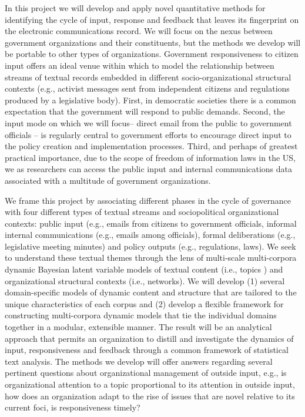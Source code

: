 In this project we will develop and apply novel quantitative methods for identifying the cycle of input, response and feedback that leaves its fingerprint on the electronic communications record. We will focus on the nexus between government organizations and their constituents, but the methods we develop will be portable to other types of organizations. Government responsiveness to citizen input offers an ideal venue within which to model the relationship between streams of textual records embedded in different socio-organizational structural contexts (e.g., activist messages sent from independent citizens and regulations produced by a legislative body).  First, in democratic societies there is a common expectation that the government will respond to public demands. Second, the input mode on which we will focus-- direct email from the public to government officials -- is regularly central to government efforts to encourage direct input to the policy creation and implementation processes. Third, and perhaps of greatest practical importance, due to the scope of freedom of information laws in the US, we as researchers can access the public input and internal communications data associated with a multitude of government organizations.




We frame this project by associating different phases in the cycle of governance with four different types of textual streams and sociopolitical organizational contexts: public input (e.g., emails from citizens to government officials, informal internal communications (e.g., emails among officials), formal deliberations (e.g., legislative meeting minutes) and policy outputs (e.g., regulations, laws). We seek to understand these textual themes through the lens of multi-scale multi-corpora dynamic Bayesian latent variable models of textual content (i.e., topics \cite{Blei2003}) and organizational structural contexts (i.e., networks). We will develop (1) several domain-specific models of dynamic content and structure that are tailored to the unique characteristics of each corpus and (2) develop a flexible framework for constructing multi-corpora dynamic models that tie the individual domains together in a modular, extensible manner. The result will be an analytical approach that permits an organization to distill and investigate the dynamics of input, responsiveness and feedback through a common framework of statistical text analysis.  The methods we develop will offer answers regarding several pertinent questions about organizational management of outside input, e.g., is organizational attention to a topic proportional to its attention in outside input, how does an organization adapt to the rise of issues that are novel relative to its current foci, is responsiveness timely?

